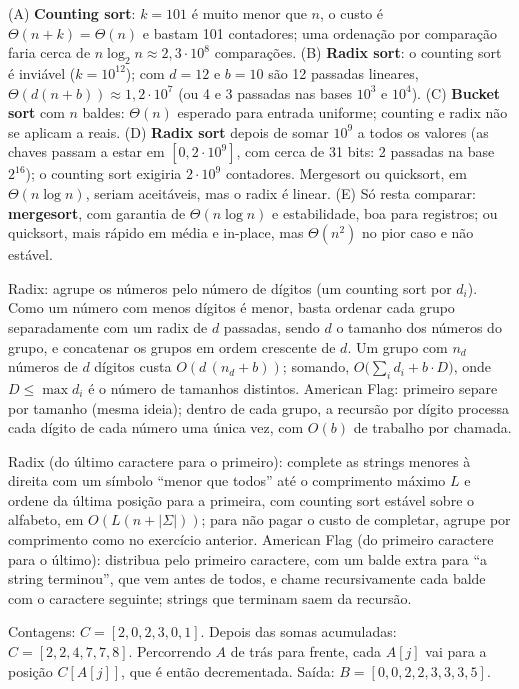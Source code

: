  (A) \textbf{Counting sort}: $k=101$ é muito menor que $n$, o custo é $\Theta(n+k)=\Theta(n)$ e bastam 101 contadores; uma ordenação por comparação faria cerca de $n\log_2n\approx2{,}3\cdot10^8$ comparações. (B) \textbf{Radix sort}: o counting sort é inviável ($k=10^{12}$); com $d=12$ e $b=10$ são 12 passadas lineares, $\Theta(d(n+b))\approx1{,}2\cdot10^7$ (ou 4 e 3 passadas nas bases $10^3$ e $10^4$). (C) \textbf{Bucket sort} com $n$ baldes: $\Theta(n)$ esperado para entrada uniforme; counting e radix não se aplicam a reais. (D) \textbf{Radix sort} depois de somar $10^9$ a todos os valores (as chaves passam a estar em $[0,2\cdot10^9]$, com cerca de 31 bits: 2 passadas na base $2^{16}$); o counting sort exigiria $2\cdot10^9$ contadores. Mergesort ou quicksort, em $\Theta(n\log n)$, seriam aceitáveis, mas o radix é linear. (E) Só resta comparar: \textbf{mergesort}, com garantia de $\Theta(n\log n)$ e estabilidade, boa para registros; ou quicksort, mais rápido em média e in-place, mas $\Theta(n^2)$ no pior caso e não estável.

 Radix: agrupe os números pelo número de dígitos (um counting sort por $d_i$). Como um número com menos dígitos é menor, basta ordenar cada grupo separadamente com um radix de $d$ passadas, sendo $d$ o tamanho dos números do grupo, e concatenar os grupos em ordem crescente de $d$. Um grupo com $n_d$ números de $d$ dígitos custa $O(d\,(n_d+b))$; somando, $O\big(\sum_id_i+b\cdot D\big)$, onde $D\le\max d_i$ é o número de tamanhos distintos. American Flag: primeiro separe por tamanho (mesma ideia); dentro de cada grupo, a recursão por dígito processa cada dígito de cada número uma única vez, com $O(b)$ de trabalho por chamada.

 Radix (do último caractere para o primeiro): complete as strings menores à direita com um símbolo ``menor que todos'' até o comprimento máximo $L$ e ordene da última posição para a primeira, com counting sort estável sobre o alfabeto, em $O(L(n+|\Sigma|))$; para não pagar o custo de completar, agrupe por comprimento como no exercício anterior. American Flag (do primeiro caractere para o último): distribua pelo primeiro caractere, com um balde extra para ``a string terminou'', que vem antes de todos, e chame recursivamente cada balde com o caractere seguinte; strings que terminam saem da recursão.

 Contagens: $C=[2,0,2,3,0,1]$. Depois das somas acumuladas: $C=[2,2,4,7,7,8]$. Percorrendo $A$ de trás para frente, cada $A[j]$ vai para a posição $C[A[j]]$, que é então decrementada. Saída: $B=[0,0,2,2,3,3,3,5]$.

